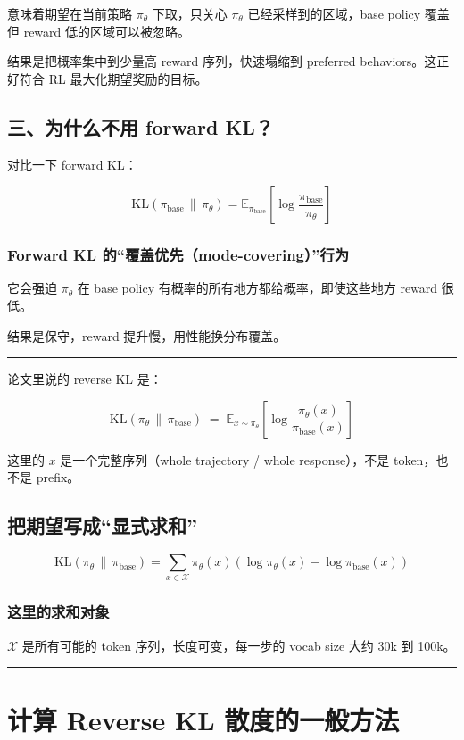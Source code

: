意味着期望在当前策略 \(\pi_\theta\) 下取，只关心 \(\pi_\theta\) 已经采样到的区域，base policy 覆盖但 reward 低的区域可以被忽略。

结果是把概率集中到少量高 reward 序列，快速塌缩到 preferred behaviors。这正好符合 RL 最大化期望奖励的目标。

\subsection{三、为什么不用 forward KL？}

对比一下 forward KL：

\[
\mathrm{KL}(\pi_{\text{base}} \,\|\, \pi_\theta) = \mathbb{E}_{\pi_{\text{base}}}\left[\log \frac{\pi_{\text{base}}}{\pi_\theta}\right]
\]

\subsubsection{Forward KL 的“覆盖优先（mode-covering）”行为}

它会强迫 \(\pi_\theta\) 在 base policy 有概率的所有地方都给概率，即使这些地方 reward 很低。

结果是保守，reward 提升慢，用性能换分布覆盖。

\hrule

论文里说的 reverse KL 是：

\[
\mathrm{KL}(\pi_\theta \,\|\, \pi_{\text{base}}) \;=\; \mathbb{E}_{x \sim \pi_\theta} \left[ \log \frac{\pi_\theta(x)}{\pi_{\text{base}}(x)} \right]
\]

这里的 \(x\) 是一个完整序列（whole trajectory / whole response），不是 token，也不是 prefix。

\subsection{把期望写成“显式求和”}

\[
\mathrm{KL}(\pi_\theta \,\|\, \pi_{\text{base}}) = \sum_{x \in \mathcal{X}} \pi_\theta(x) \left( \log \pi_\theta(x) - \log \pi_{\text{base}}(x) \right)
\]

\subsubsection{这里的求和对象}

\(\mathcal{X}\) 是所有可能的 token 序列，长度可变，每一步的 vocab size 大约 30k 到 100k。

\hrule

\section{计算 Reverse KL 散度的一般方法}

